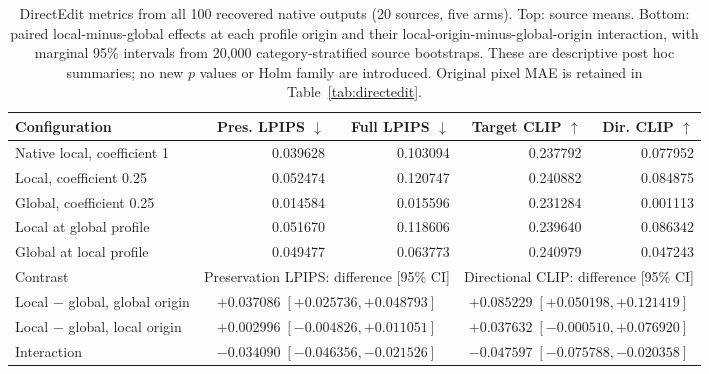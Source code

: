 \begin{table}[!t]
\centering\footnotesize
\setlength{\tabcolsep}{5pt}
\caption{DirectEdit metrics from all 100 recovered native outputs (20 sources, five arms). Top: source means. Bottom: paired local-minus-global effects at each profile origin and their local-origin-minus-global-origin interaction, with marginal 95\% intervals from 20,000 category-stratified source bootstraps. These are descriptive post hoc summaries; no new $p$ values or Holm family are introduced. Original pixel MAE is retained in Table~\ref{tab:directedit}.}
\label{tab:directedit-native-20261106}
\begin{tabular}{@{}lrrrr@{}}
\toprule
Configuration & Pres. LPIPS $\downarrow$ & Full LPIPS $\downarrow$ & Target CLIP $\uparrow$ & Dir. CLIP $\uparrow$\\
\midrule
Native local, coefficient 1 & 0.039628 & 0.103094 & 0.237792 & 0.077952\\
Local, coefficient 0.25 & 0.052474 & 0.120747 & 0.240882 & 0.084875\\
Global, coefficient 0.25 & 0.014584 & 0.015596 & 0.231284 & 0.001113\\
Local at global profile & 0.051670 & 0.118606 & 0.239640 & 0.086342\\
Global at local profile & 0.049477 & 0.063773 & 0.240979 & 0.047243\\
\midrule
Contrast & \multicolumn{2}{c}{Preservation LPIPS: difference [95\% CI]} & \multicolumn{2}{c}{Directional CLIP: difference [95\% CI]}\\
\midrule
Local $-$ global, global origin & \multicolumn{2}{c}{$+0.037086\;[+0.025736,+0.048793]$} & \multicolumn{2}{c}{$+0.085229\;[+0.050198,+0.121419]$}\\
Local $-$ global, local origin & \multicolumn{2}{c}{$+0.002996\;[-0.004826,+0.011051]$} & \multicolumn{2}{c}{$+0.037632\;[-0.000510,+0.076920]$}\\
Interaction & \multicolumn{2}{c}{$-0.034090\;[-0.046356,-0.021526]$} & \multicolumn{2}{c}{$-0.047597\;[-0.075788,-0.020358]$}\\
\bottomrule
\end{tabular}
\end{table}
